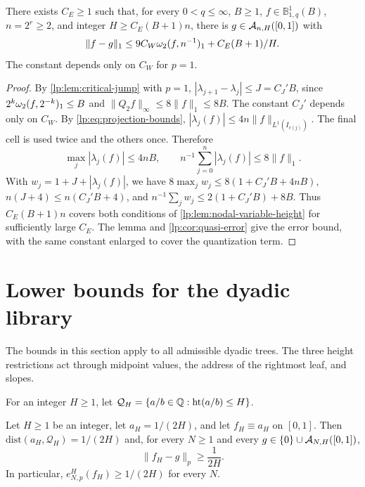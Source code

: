 \documentclass[11pt,a4paper]{article}
\begin{document}
\begin{proposicao}
\label{lp:prop:l1-linear-height}
There exists $C_E\ge1$ such that, for every $0<q\le\infty$, $B\ge1$, $f\in\mathbb B^1_{1,q}(B)$, $n=2^r\ge2$, and integer $H\ge C_E(B+1)n$, there is $g\in\mathcal A_{n,H}([0,1])$ with
\[
 \|f-g\|_1\le9C_W\omega_2(f,n^{-1})_{1}+C_E(B+1)/H.
\]
The constant depends only on $C_W$ for $p=1$.
\end{proposicao}

\begin{proof}
By \cref{lp:lem:critical-jump} with $p=1$, $|\lambda_{j+1}-\lambda_j|\le J=C_J'B$, since $2^k\omega_2(f,2^{-k})_{1}\le B$ and $\|Q_2f\|_\infty\le8\|f\|_1\le8B$. The constant $C_J'$ depends only on $C_W$. By \eqref{lp:eq:projection-bounds}, $|\lambda_j(f)|\le4n\|f\|_{L^1(I_{c(j)})}$. The final cell is used twice and the others once. Therefore
\[
 \max_j|\lambda_j(f)|\le4nB,\qquad n^{-1}\sum_{j=0}^n|\lambda_j(f)|\le8\|f\|_1.
\]
With $w_j=1+J+|\lambda_j(f)|$, we have $8\max_jw_j\le8(1+C_J'B+4nB)$, $n(J+4)\le n(C_J'B+4)$, and $n^{-1}\sum_jw_j\le2(1+C_J'B)+8B$. Thus $C_E(B+1)n$ covers both conditions of \cref{lp:lem:nodal-variable-height} for sufficiently large $C_E$. The lemma and \cref{lp:cor:quasi-error} give the error bound, with the same constant enlarged to cover the quantization term.
\end{proof}

\section{Lower bounds for the dyadic library}
\label{lp:sec:floors}

The bounds in this section apply to all admissible dyadic trees. The three height restrictions act through midpoint values, the address of the rightmost leaf, and slopes.

For an integer $H\ge1$, let $\mathcal Q_H=\{a/b\in\mathbb Q:\operatorname{ht}(a/b)\le H\}$.

\begin{proposicao}
\label{lp:prop:floor}
Let $H\ge1$ be an integer, let $a_H=1/(2H)$, and let $f_H\equiv a_H$ on $[0,1]$. Then $\mathrm{dist}(a_H,\mathcal Q_H)=1/(2H)$ and, for every $N\ge1$ and every $g\in\{0\}\cup\mathcal A_{N,H}([0,1])$,
\begin{equation}
 \|f_H-g\|_p\ge\frac1{2H}.
 \label{lp:eq:floor}
\end{equation}
In particular, $e^{H}_{N,p}(f_H)\ge1/(2H)$ for every $N$.
\end{proposicao}
\end{document}
